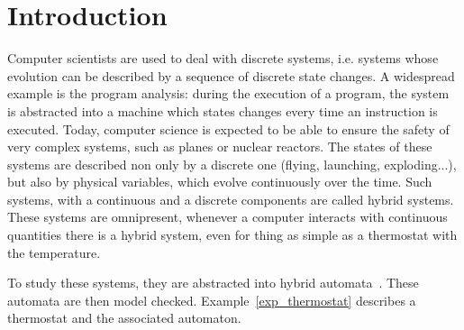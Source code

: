 \section{Introduction}
Computer scientists are used to deal with discrete systems, i.e. systems whose evolution can be described by a sequence of discrete state changes. A widespread example is the program analysis: during the execution of a program, the system is abstracted into a machine which states changes every time an instruction is executed.
Today, computer science is expected to be able to ensure the safety of very complex systems, such as planes or nuclear reactors. The states of these systems are described non only by a discrete one (flying, launching, exploding...), but also by physical variables, which evolve continuously over the time. Such systems, with a continuous and a discrete components are called hybrid systems. These systems are omnipresent, whenever a computer interacts with continuous quantities there is a hybrid system, even for thing as simple as a thermostat with the temperature.

To study these systems, they are abstracted into hybrid automata~\cite{colas}. These automata are then model checked. Example~\ref{exp_thermostat} describes a thermostat and the associated automaton.

